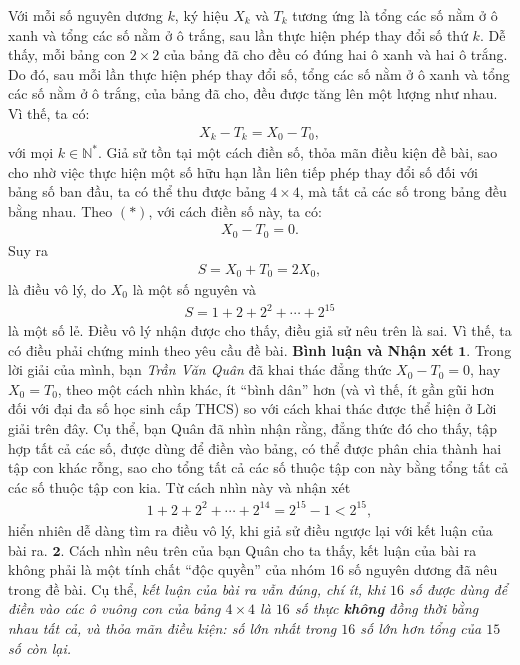 \begin{multicols}{2}
	\vskip 0.05cm
	Với mỗi số nguyên dương $k$, ký hiệu $X_k$  và $T_k$  tương ứng là tổng các số nằm ở ô xanh và tổng các số nằm ở ô trắng, sau lần thực hiện phép thay đổi số thứ $k$.
	\vskip 0.05cm
	Dễ thấy, mỗi bảng con $2 \times 2$ của bảng đã cho đều có đúng hai ô xanh và hai ô trắng. Do đó, sau mỗi lần thực hiện phép thay đổi số, tổng các số nằm ở ô xanh và tổng các số nằm ở ô trắng, của bảng đã cho, đều được tăng lên một lượng như nhau. Vì thế, ta có:
	\begin{align*}
		X_k - T_k = X_0 - T_0, \tag{$*$}
	\end{align*}
	với mọi $k \in \mathbb{N^*}$.
	\vskip 0.05cm
	Giả sử tồn tại một cách điền số, thỏa mãn điều kiện đề bài, sao cho nhờ việc thực hiện một số hữu hạn lần liên tiếp phép thay đổi số đối với bảng số ban đầu, ta có thể thu được bảng $4 \times 4$, mà tất cả các số trong bảng đều bằng nhau. Theo $(*)$, với cách điền số này, ta có:
	\begin{align*}
		{X_0} - {T_0} = 0.
	\end{align*}
	Suy ra
	\begin{align*}
		S = {X_0} + {T_0} = 2{X_0},
	\end{align*}
	là điều vô lý, do $X_0$  là một số nguyên và
	\begin{align*}
		S = 1 + 2 + {2^2} +  \cdots  + {2^{15}}
	\end{align*}
	là một số lẻ.
	\vskip 0.05cm
	Điều vô lý nhận được cho thấy, điều giả sử nêu trên là sai. Vì thế, ta có điều phải chứng minh theo yêu cầu đề bài.
	\vskip 0.05cm
	\textbf{\color{thachthuctoanhoc}Bình luận và Nhận xét}
	\vskip 0.05cm
	$\pmb{1.}$ Trong lời giải của mình, bạn \textit{Trần Văn Quân} đã khai thác đẳng thức $X_0 - T_0 = 0$,  hay $X_0 = T_0$,  theo một cách nhìn khác, ít “bình dân” hơn (và vì thế, ít gần gũi hơn đối với đại đa số học sinh cấp THCS) so với cách khai thác được thể hiện ở Lời giải trên đây. Cụ thể, bạn Quân đã nhìn nhận rằng, đẳng thức đó cho thấy, tập hợp tất cả các số, được dùng để điền vào bảng, có thể được phân chia thành hai tập con khác rỗng, sao cho tổng tất cả các số thuộc tập con này bằng tổng tất cả các số thuộc tập con kia. Từ cách nhìn này và nhận xét
	\begin{align*}
		1 + 2 + {2^2} +  \cdots  + {2^{14}} = {2^{15}} - 1 < {2^{15}},
	\end{align*}
	hiển nhiên dễ dàng tìm ra điều vô lý, khi giả sử điều ngược lại với kết luận của bài ra.
	\vskip 0.05cm
	$\pmb{2.}$ Cách nhìn nêu trên của bạn Quân cho ta thấy, kết luận của bài ra không phải là một \linebreak tính chất “độc quyền” của nhóm $16$ số nguyên dương đã nêu trong đề bài. Cụ thể, \textit{kết luận của bài ra vẫn đúng, chí ít, khi $16$ số được dùng để điền vào các ô vuông con của bảng $4 \times 4$ là $16$ số thực \textbf{\color{thachthuctoanhoc}không} đồng thời bằng nhau tất cả, và thỏa mãn điều kiện: số lớn nhất trong $16$ số lớn hơn tổng của $15$ số còn lại.}

\end{multicols}
